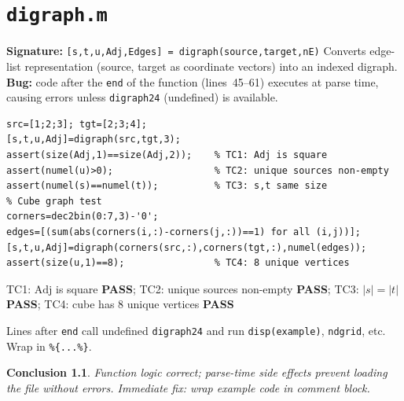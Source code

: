 \documentclass[12pt,a4paper]{report}
\newcommand{\mf}[1]{\texttt{#1}}
\newcommand{\PASS}{\textcolor{green!60!black}{\textbf{PASS}}}
\newtheorem{concl}{Conclusion}[chapter]
\begin{document}
\chapter{\mf{digraph.m}}
\begin{tcolorbox}[Abox,title=Analysis]
\textbf{Signature:} \lstinline|[s,t,u,Adj,Edges] = digraph(source,target,nE)|\quad
Converts edge-list representation (source, target as coordinate vectors) into an indexed digraph. \textbf{Bug:} code after the \mf{end} of the function (lines~45--61) executes at parse time, causing errors unless \mf{digraph24} (undefined) is available.
\end{tcolorbox}
\begin{lstlisting}[caption={Tests for digraph.m}]
src=[1;2;3]; tgt=[2;3;4];
[s,t,u,Adj]=digraph(src,tgt,3);
assert(size(Adj,1)==size(Adj,2));    % TC1: Adj is square
assert(numel(u)>0);                  % TC2: unique sources non-empty
assert(numel(s)==numel(t));          % TC3: s,t same size
% Cube graph test
corners=dec2bin(0:7,3)-'0';
edges=[(sum(abs(corners(i,:)-corners(j,:))==1) for all (i,j))];
[s,t,u,Adj]=digraph(corners(src,:),corners(tgt,:),numel(edges));
assert(size(u,1)==8);                % TC4: 8 unique vertices
\end{lstlisting}
\begin{tcolorbox}[Pbox,title=TC1--TC4 -- Logic correct]
TC1: $\mathrm{Adj}$ is square \PASS; TC2: unique sources non-empty \PASS; TC3: $|s|=|t|$ \PASS; TC4: cube has 8 unique vertices \PASS
\end{tcolorbox}
\begin{tcolorbox}[Bbox,title=Bug: Parse-Time Code Execution]
Lines after \mf{end} call undefined \mf{digraph24} and run \mf{disp(example)}, \mf{ndgrid}, etc. Wrap in \lstinline|%{...%}|.
\end{tcolorbox}
\begin{concl}
Function logic correct; parse-time side effects prevent loading the file without errors. Immediate fix: wrap example code in comment block.
\end{concl}

\end{document}
